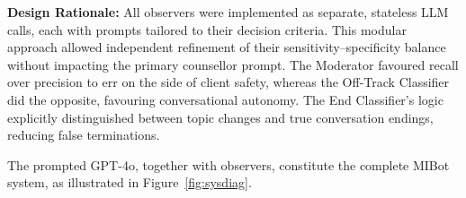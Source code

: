 \textbf{Design Rationale:} All observers were implemented as separate, stateless LLM calls, each with prompts tailored to their decision criteria. This modular approach allowed independent refinement of their sensitivity–specificity balance without impacting the primary counsellor prompt. The Moderator favoured recall over precision to err on the side of client safety, whereas the Off-Track Classifier did the opposite, favouring conversational autonomy. The End Classifier's logic explicitly distinguished between topic changes and true conversation endings, reducing false terminations.


The prompted GPT-4o, together with observers, constitute the complete MIBot system, as illustrated in Figure~\ref{fig:sysdiag}.





